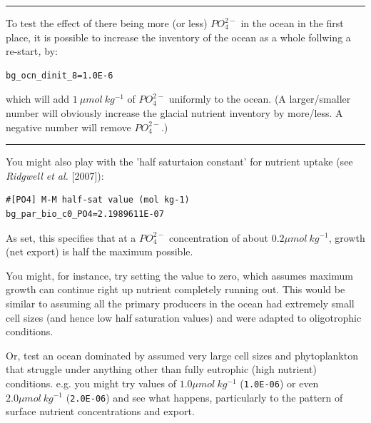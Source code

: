 \vspace{1mm} \noindent\rule{4cm}{0.5pt} \vspace{2mm}

\noindent To test the effect of there being more (or less) \(PO^{2-}_{4}\) in the ocean in the first place, it is possible to increase the inventory of the ocean as a whole follwing a re-start\textit{, }by:
\vspace{-2mm}\small\begin{verbatim}
bg_ocn_dinit_8=1.0E-6
\end{verbatim}\normalsize\vspace{-2mm}
which will add \(1\:\mu mol\:kg^{-1}\) of \(PO^{2-}_{4}\) uniformly to the ocean. (A larger/smaller number will obviously increase the glacial nutrient inventory by more/less. A negative number will remove \(PO^{2-}_{4}\).)

\vspace{1mm} \noindent\rule{4cm}{0.5pt} \vspace{2mm}

\noindent You might also play with the 'half saturtaion constant' for nutrient uptake (see \textit{Ridgwell et al.} [2007]):
\vspace{-2mm}\small\begin{verbatim}
#[PO4] M-M half-sat value (mol kg-1)
bg_par_bio_c0_PO4=2.1989611E-07
\end{verbatim}\normalsize\vspace{-1mm}
As set, this specifies that at a \(PO^{2-}_{4}\) concentration of about \(0.2 \mu mol \:kg^{-1} \), growth (net export) is half the maximum possible.

\vspace{1mm}
You might, for instance, try setting the value to zero, which assumes maximum growth can continue right up nutrient completely running out. This would be similar to assuming all the primary producers in the ocean had extremely small cell sizes (and hence low half saturation values) and were adapted to oligotrophic conditions.

Or, test an ocean dominated by assumed very large cell sizes and phytoplankton that struggle under anything other than fully eutrophic (high nutrient) conditions. e.g. you might try values of \(1.0 \mu mol \:kg^{-1}\) (\texttt{1.0E-06}) or even \(2.0 \mu mol \:kg^{-1}\) (\texttt{2.0E-06}) and see what happens, particularly to the pattern of surface nutrient concentrations and export.

